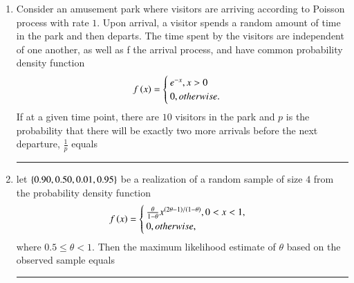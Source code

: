 \documentclass[journal]{IEEEtran}
\begin{document}
\begin{enumerate}
	\item Consider an amusement park where visitors are arriving according to  Poisson process with rate $1$. Upon arrival, a visitor spends a random amount of time in the park and then departs. The time spent by the visitors are independent of one another, as well as f the arrival process, and have common probability density function 
       \begin{align*}
         f\left(x\right)=\begin{cases}
                 e^{-x},x>0\\
                 0,otherwise.
             \end{cases}
             \end{align*}
        If at a given time point, there are $10$ visitors in the park and $p$ is the probability that there will be exactly two more arrivals before the next departure, $\frac{1}{p}$ equals \rule{1cm}{0.15mm}
	\item let $\left\{0.90,0.50,0.01,0.95\right\}$ be a realization of a random sample of size $4$ from the probability density function
        \begin{align*}
            f\left(x\right)=\begin{cases}
                \frac{\theta }{1-\theta}x^{\left(2\theta-1\right)/\left(1-\theta\right)},0<x<1,\\
                0, otherwise,
            \end{cases}
        \end{align*}
        where $0.5\leq \theta <1$. Then the maximum likelihood estimate of $\theta$ based on the observed sample equals \rule{1cm}{0.15mm} 
         

\end{enumerate}
\end{document}
